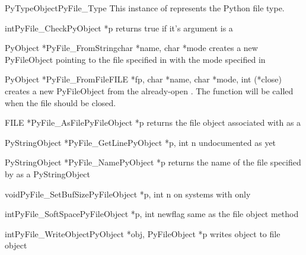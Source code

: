 \documentclass[twoside,openright]{report}
\begin{document}
\begin{cvardesc}{PyTypeObject}{PyFile_Type}
This instance of  represents the Python file type.
\end{cvardesc}

\begin{cfuncdesc}{int}{PyFile_Check}{PyObject *p}
returns true if it's argument is a 
\end{cfuncdesc}

\begin{cfuncdesc}{PyObject *}{PyFile_FromString}{char *name, char *mode}
creates a new PyFileObject pointing to the file
specified in  with the mode specified in 
\end{cfuncdesc}

\begin{cfuncdesc}{PyObject *}{PyFile_FromFile}{FILE *fp,
              char *name, char *mode, int (*close})
creates a new PyFileObject from the already-open .
The function  will be called when the file should be closed.
\end{cfuncdesc}

\begin{cfuncdesc}{FILE *}{PyFile_AsFile}{PyFileObject *p}
returns the file object associated with  as a 
\end{cfuncdesc}

\begin{cfuncdesc}{PyStringObject *}{PyFile_GetLine}{PyObject *p, int n}
undocumented as yet
\end{cfuncdesc}

\begin{cfuncdesc}{PyStringObject *}{PyFile_Name}{PyObject *p}
returns the name of the file specified by  as a 
PyStringObject
\end{cfuncdesc}

\begin{cfuncdesc}{void}{PyFile_SetBufSize}{PyFileObject *p, int n}
on systems with  only
\end{cfuncdesc}

\begin{cfuncdesc}{int}{PyFile_SoftSpace}{PyFileObject *p, int newflag}
same as the file object method 
\end{cfuncdesc}

\begin{cfuncdesc}{int}{PyFile_WriteObject}{PyObject *obj, PyFileObject *p}
writes object  to file object 
\end{cfuncdesc}
\end{document}

